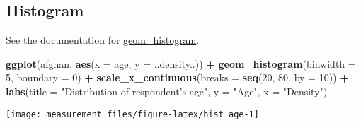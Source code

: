 \documentclass[]{book}
\newenvironment{Shaded}{\begin{snugshade}}{\end{snugshade}}
\newcommand{\DataTypeTok}[1]{\textcolor[rgb]{0.13,0.29,0.53}{#1}}
\newcommand{\DecValTok}[1]{\textcolor[rgb]{0.00,0.00,0.81}{#1}}
\newcommand{\FloatTok}[1]{\textcolor[rgb]{0.00,0.00,0.81}{#1}}
\newcommand{\KeywordTok}[1]{\textcolor[rgb]{0.13,0.29,0.53}{\textbf{#1}}}
\newcommand{\NormalTok}[1]{#1}
\newcommand{\OperatorTok}[1]{\textcolor[rgb]{0.81,0.36,0.00}{\textbf{#1}}}
\newcommand{\StringTok}[1]{\textcolor[rgb]{0.31,0.60,0.02}{#1}}
\theoremstyle{definition}
\theoremstyle{definition}
\theoremstyle{definition}
\theoremstyle{remark}
\begin{document}
\hypertarget{histogram}{%
\subsection{Histogram}\label{histogram}}

See the documentation for
\href{https://www.rdocumentation.org/packages/ggplot2/topics/geom_histogram}{geom\_histogram}.

\begin{Shaded}
\begin{Highlighting}[]
\KeywordTok{ggplot}\NormalTok{(afghan, }\KeywordTok{aes}\NormalTok{(}\DataTypeTok{x =}\NormalTok{ age, }\DataTypeTok{y =}\NormalTok{ ..density..)) }\OperatorTok{+}
\StringTok{  }\KeywordTok{geom_histogram}\NormalTok{(}\DataTypeTok{binwidth =} \DecValTok{5}\NormalTok{, }\DataTypeTok{boundary =} \DecValTok{0}\NormalTok{) }\OperatorTok{+}
\StringTok{  }\KeywordTok{scale_x_continuous}\NormalTok{(}\DataTypeTok{breaks =} \KeywordTok{seq}\NormalTok{(}\DecValTok{20}\NormalTok{, }\DecValTok{80}\NormalTok{, }\DataTypeTok{by =} \DecValTok{10}\NormalTok{)) }\OperatorTok{+}
\StringTok{  }\KeywordTok{labs}\NormalTok{(}\DataTypeTok{title =} \StringTok{"Distribution of respondent's age"}\NormalTok{,}
       \DataTypeTok{y =} \StringTok{"Age"}\NormalTok{, }\DataTypeTok{x =} \StringTok{"Density"}\NormalTok{)}
\end{Highlighting}
\end{Shaded}

\begin{center}\texttt{[image: measurement\_files/figure-latex/hist\_age-1]} \end{center}

\begin{Shaded}
\end{Shaded}
\end{document}

